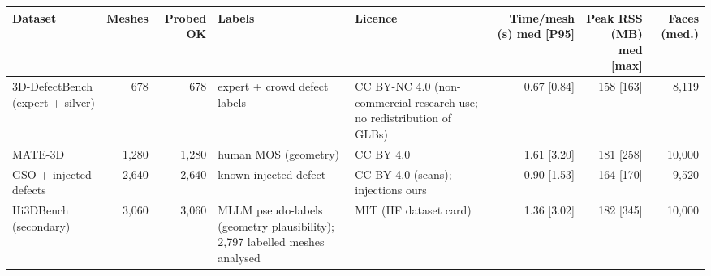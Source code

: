 \begin{tabular}{p{3.2cm}rrp{3.0cm}p{3.4cm}rrr}
\toprule
Dataset & Meshes & Probed OK & Labels & Licence & Time/mesh (s) med [P95] & Peak RSS (MB) med [max] & Faces (med.)\\
\midrule
3D-DefectBench (expert + silver) & 678 & 678 & expert + crowd defect labels & CC BY-NC 4.0 (non-commercial research use; no redistribution of GLBs) & 0.67 [0.84] & 158 [163] & 8,119\\
MATE-3D & 1,280 & 1,280 & human MOS (geometry) & CC BY 4.0 & 1.61 [3.20] & 181 [258] & 10,000\\
GSO + injected defects & 2,640 & 2,640 & known injected defect & CC BY 4.0 (scans); injections ours & 0.90 [1.53] & 164 [170] & 9,520\\
Hi3DBench (secondary) & 3,060 & 3,060 & MLLM pseudo-labels (geometry plausibility); 2,797 labelled meshes analysed & MIT (HF dataset card) & 1.36 [3.02] & 182 [345] & 10,000\\
\bottomrule
\end{tabular}
